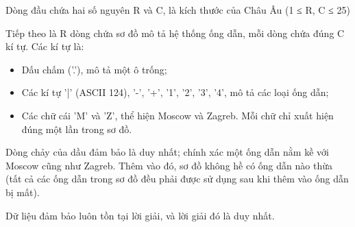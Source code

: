Dòng đầu chứa hai số nguyên R và C, là kích thước của Châu Âu (1 ≤ R, C ≤ 25)  

   Tiếp theo là R dòng chứa sơ đồ mô tả hệ thống ống dẫn, mỗi dòng chứa đúng C kí tự. Các kí tự là:  
\begin{itemize}
	\item     Dấu chấm ('.'), mô tả một ô trống;   
	\item     Các kí tự '|' (ASCII 124), '-', '+', '1', '2', '3', '4', mô tả các loại ống dẫn;   
	\item     Các chữ cái 'M' và 'Z', thể hiện Moscow và Zagreb. Mỗi chữ chỉ xuất hiện đúng một lần trong sơ đồ.   
\end{itemize}

   Dòng chảy của dầu đảm bảo là duy nhất; chính xác một ống dẫn nằm kề với Moscow cũng như Zagreb. Thêm vào đó, sơ đồ không hề có ống dẫn nào thừa (tất cả các ống dẫn trong sơ đồ đều phải được sử dụng sau khi thêm vào ống dẫn bị mất).  

   Dữ liệu đảm bảo luôn tồn tại lời giải, và lời giải đó là duy nhất.